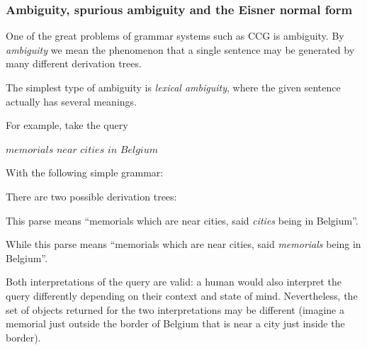\documentclass[main.tex]{subfiles}
\begin{document}
\subsubsection{Ambiguity, spurious ambiguity and the Eisner normal form}
One of the great problems of grammar systems such as CCG is ambiguity.
By \emph{ambiguity} we mean the phenomenon that a single sentence may be
generated by many different derivation trees.

The simplest type of ambiguity is \emph{lexical ambiguity}, where the given
sentence actually has several meanings.

\begin{example}
    For example, take the query
    \begin{center}
        $memorials$ $near$ $cities$ $in$ $Belgium$
    \end{center}
    With the following simple grammar:


    There are two possible derivation trees:


    This parse means ``memorials which are near cities, said \emph{cities} being
    in Belgium''.


    While this parse means ``memorials which are near cities, said \emph{memorials}
    being in Belgium''.

    Both interpretations of the query are valid: a human would also interpret
    the query differently depending on their context and state of mind.
    Nevertheless, the set of objects returned for the two interpretations may
    be different (imagine a memorial just outside the border of Belgium
    that is near a city just inside the border).
\end{example}
\end{document}
